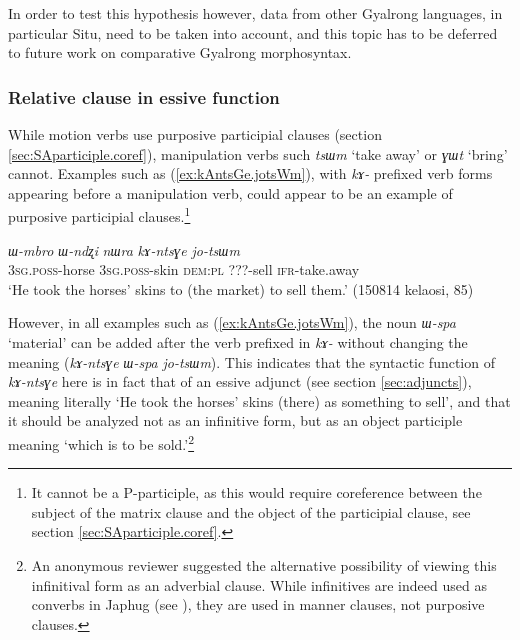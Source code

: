 \documentclass[oneside,a4paper,11pt]{article}
\newcommand{\ipa}[1]{\textit{\phon#1}}
\newcommand{\jpg}[2]{\ipa{#1} `#2'}
\begin{document}
In order to test this hypothesis however, data from other Gyalrong languages, in particular Situ, need to be taken into account, and this topic has to be deferred to future work on comparative Gyalrong morphosyntax.


\subsubsection{Relative clause in essive function} \label{sec:essive}
While motion verbs use purposive participial clauses (section \ref{sec:SAparticiple.coref}), manipulation verbs such \jpg{tsɯm}{take away} or \jpg{ɣɯt}{bring} cannot. Examples such as (\ref{ex:kAntsGe.jotsWm}), with \ipa{kɤ-} prefixed verb forms appearing before a manipulation verb, could appear to be an example of purposive participial clauses.\footnote{It cannot be a P-participle, as this would require coreference between the subject of the matrix clause and the object of the participial clause, see section \ref{sec:SAparticiple.coref}.}

\begin{exe}
\ex \label{ex:kAntsGe.jotsWm}
\gll \ipa{ɯ-mbro} 	\ipa{ɯ-ndʐi} 	\ipa{nɯra} 	\ipa{kɤ-ntsɣe} 	\ipa{jo-tsɯm} \\
\textsc{3sg.poss}-horse \textsc{3sg.poss}-skin \textsc{dem:pl} ???-sell \textsc{ifr}-take.away \\
\glt `He took the horses' skins to (the market) to sell them.' (150814 kelaosi, 85)
\end{exe}

However, in all examples such as (\ref{ex:kAntsGe.jotsWm}), the noun \jpg{ɯ-spa}{material} can be added after the verb prefixed in \ipa{kɤ-} without changing the meaning (\ipa{kɤ-ntsɣe} \ipa{ɯ-spa} \ipa{jo-tsɯm}). This indicates that the syntactic function of \ipa{kɤ-ntsɣe} here is in fact that of an essive adjunct (see section \ref{sec:adjuncts}), meaning literally `He took the horses' skins (there) as something to sell', and that it should be analyzed not as an infinitive form, but as an object participle meaning `which is to be sold.'\footnote{An anonymous reviewer suggested the alternative possibility of viewing this infinitival form as an adverbial clause. While infinitives are indeed used as converbs in Japhug (see \citealt[321-2]{jacques14linking}), they are used in manner clauses, not purposive clauses. }
\end{document}
